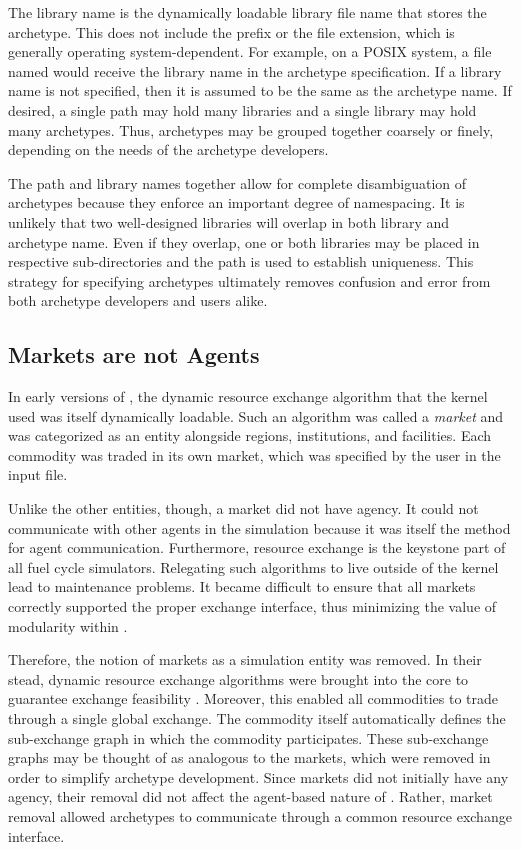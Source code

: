 The library name is the dynamically loadable library file name that stores the
archetype. This does not include the  prefix or the file extension,
which is generally operating system-dependent.  For example, on a
POSIX system,
a file named  would receive the library name 
in the archetype specification.
If a library name is not specified, then it is assumed to be the same as the
archetype name.
If desired, a single path may hold many libraries and a single library may hold
many archetypes. Thus, archetypes may be grouped
together coarsely or finely, depending on the needs of the archetype developers.

The path and library names together allow for complete disambiguation of
archetypes because they enforce an important degree of namespacing.  It is unlikely
that two well-designed libraries will overlap in both library and archetype name.
Even if they overlap, one or both libraries may be placed in respective
sub-directories and the path is used to establish uniqueness.
This strategy for specifying archetypes ultimately removes confusion and error from
both archetype developers and users alike.

\subsection{Markets are not Agents}

In early versions of \cyclus, the dynamic resource exchange algorithm that the
kernel used was itself dynamically loadable. Such an algorithm was called a
\emph{market} and was categorized as an entity alongside regions,
institutions, and facilities.
Each commodity was traded in its own market, which was specified by
the user in the input file.

Unlike the other entities, though, a market did not have agency.  It could not
communicate with other agents in the simulation because it was itself the method
for agent communication.  Furthermore, resource exchange is the keystone
part of all fuel cycle simulators.
Relegating such algorithms to live outside of
the kernel lead to maintenance problems. It became difficult to
ensure that all markets correctly supported the proper exchange interface,
thus minimizing the value of modularity within \cyclus.

Therefore, the notion of markets as a simulation entity was removed. In their
stead, dynamic resource exchange algorithms were brought into the core to
guarantee exchange feasibility \cite{Gidden2016}. Moreover, this enabled all commodities to trade
through a single global exchange. The commodity itself automatically defines
the sub-exchange graph in which the commodity participates.
These sub-exchange graphs may be thought of as analogous to the
markets, which were removed in order to simplify archetype development.
Since markets did not initially have any agency, their removal did not
affect the agent-based
nature of \cyclus.  Rather, market removal allowed archetypes to
communicate through a common resource exchange interface.

